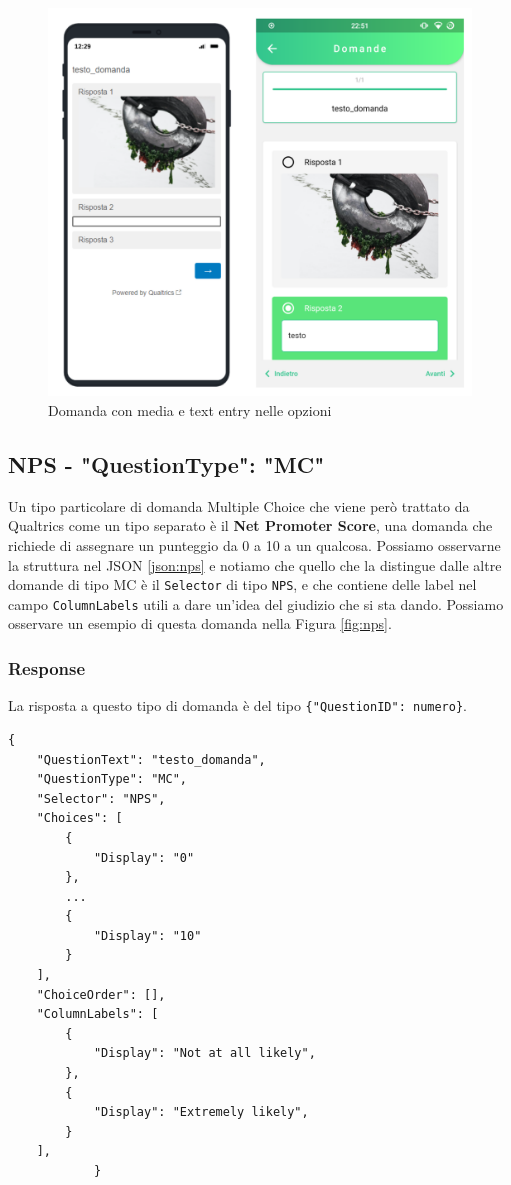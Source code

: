 \begin{figure}[h!]
\centering
\includegraphics[width=\textwidth]{img/mc_media}
\caption{Domanda con media e text entry nelle opzioni}
\label{fig:mc_media}
\end{figure}

\clearpage
\subsection{NPS - "QuestionType": "MC"}
Un tipo particolare di domanda Multiple Choice che viene però trattato da Qualtrics come un tipo separato è il \textbf{Net Promoter Score}, una domanda che richiede di assegnare un punteggio da 0 a 10 a un qualcosa. Possiamo osservarne la struttura nel JSON \ref{json:nps} e notiamo che quello che la distingue dalle altre domande di tipo MC è il \texttt{Selector} di tipo \texttt{NPS}, e che contiene delle label nel campo \texttt{ColumnLabels} utili a dare un'idea del giudizio che si sta dando. Possiamo osservare un esempio di questa domanda nella Figura \ref{fig:nps}.

\subsubsection{Response}
La risposta a questo tipo di domanda è del tipo \texttt{\{"QuestionID": numero\}}.

\begin{json}
\begin{verbatim}
{
    "QuestionText": "testo_domanda",
    "QuestionType": "MC",
    "Selector": "NPS",
    "Choices": [
        {
            "Display": "0"
        },
        ...
        {
            "Display": "10"
        }
    ],
    "ChoiceOrder": [],
    "ColumnLabels": [
        {
            "Display": "Not at all likely",
        },
        {
            "Display": "Extremely likely",
        }
    ],
            }
\end{verbatim}
\caption{Oggetto domanda NPS}
\label{json:nps}
\end{json}

